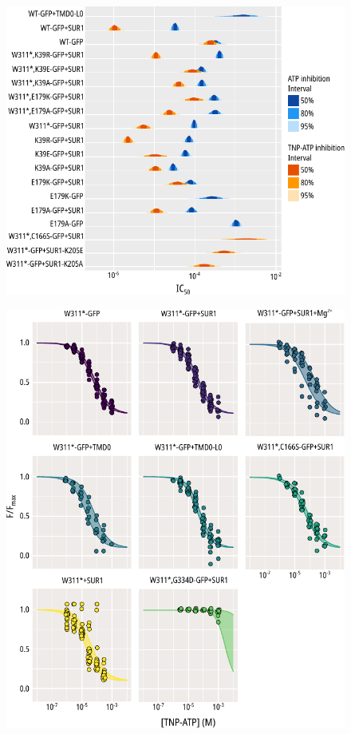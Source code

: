 \begin{figure}[h]
	\centering
	\includegraphics[width=\textwidth]{all_inhibition_params.pdf}
	\caption[Nucleotide inhibition IC\textsubscript{50} posterior distributions]{
	}
	\label{apxfig:inhib_params}
\end{figure}

\begin{figure}[h]
	\centering
	\includegraphics[width=\textwidth]{all_unroofed_fits_1.pdf}
	\caption[Unroofed membrane quenching population hill fits]{
	}
	\label{apxfig:unroofed_1}
\end{figure}


